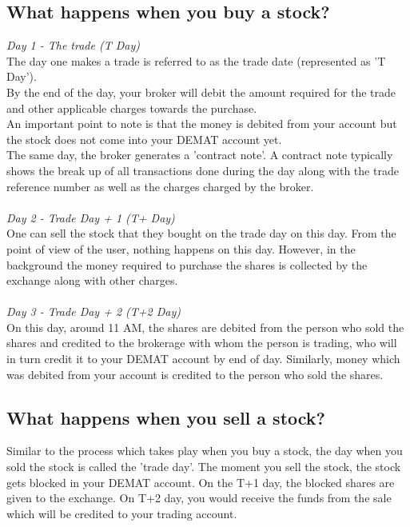 \subsection{What happens when you buy a stock?}
\textit{\large{Day 1 - The trade (T Day)}}
\\
The day one makes a trade is referred to as the trade date (represented as 'T Day').
\\
By the end of the day, your broker will debit the amount required for the trade and other applicable charges towards the purchase.
\\
An important point to note is that the money is debited from your account but the stock does not come into your DEMAT account yet.
\\
The same day, the broker generates a 'contract note'. A contract note typically shows the break up of all transactions done during the day along with the trade reference number as well as the charges charged by the broker. \\
\\
\textit{\large{Day 2 - Trade Day + 1 (T+ Day)}}
\\
One can sell the stock that they bought on the trade day on this day.
\noindent From the point of view of the user, nothing happens on this day. However, in the background the money required to purchase the shares is collected by the exchange along with other charges. \\
\\
\textit{\large{Day 3 - Trade Day + 2 (T+2 Day)}}
\\
On this day, around 11 AM, the shares are debited from the person who sold the shares and credited to the brokerage with whom the person is trading, who will in turn credit it to your DEMAT account by end of day. Similarly, money which was debited from your account is credited to the person who sold the shares.

\subsection{What happens when you sell a stock?}
Similar to the process which takes play when you buy a stock, the day when you sold the stock is called the 'trade day'. The moment you sell the stock, the stock gets blocked in your DEMAT account. On the T+1 day, the blocked shares are given to the exchange. On T+2 day, you would receive the funds from the sale which will be credited to your trading account.
